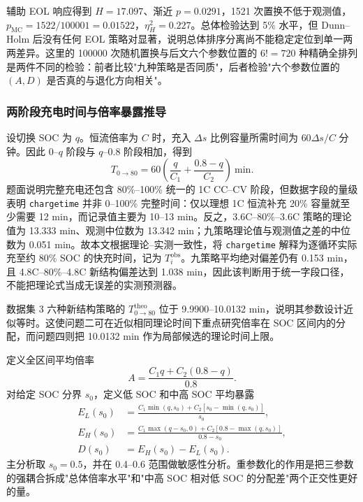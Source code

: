 \documentclass[withoutpreface]{cumcmthesis}
\begin{document}
辅助 EOL 响应得到 $H=17.097$、渐近 $p=0.0291$，1521 次置换不低于观测值，$p_{\mathrm{MC}}=1522/100001=0.01522$，$\eta_H^2=0.227$。总体检验达到 5\% 水平，但 Dunn--Holm 后没有任何 EOL 策略对显著，说明总体排序分离尚不能稳定定位到单一两两差异。这里的 100000 次随机置换与后文六个参数位置的 $6!=720$ 种精确全排列是两件不同的检验：前者比较"九种策略是否同质"，后者检验"六个参数位置的 $(A,D)$ 是否真的与退化方向相关"。

\subsubsection{两阶段充电时间与倍率暴露推导}

设切换 SOC 为 $q$。恒流倍率为 $C$ 时，充入 $\Delta s$ 比例容量所需时间为 $60\Delta s/C$ 分钟。因此 0--$q$ 阶段与 $q$--0.8 阶段相加，得到
\begin{equation}
T_{0\rightarrow80}=60\left(\frac{q}{C_1}+\frac{0.8-q}{C_2}\right)\ \mathrm{min}.
\label{eq:time}
\end{equation}
题面说明完整充电还包含 80\%--100\% 统一的 1C CC--CV 阶段，但数据字段的量级表明 \texttt{chargetime} 并非 0--100\% 完整时间：仅以理想 1C 恒流补充 20\% 容量就至少需要 12 min，而记录值主要为 10--13 min。反之，3.6C--80\%--3.6C 策略的理论值为 13.333 min、观测中位数为 13.342 min；九策略理论值与观测值之差的中位数为 0.051 min。故本文根据理论--实测一致性，将 \texttt{chargetime} 解释为逐循环实际充至约 80\% SOC 的快充时间，记为 $T_i^{\mathrm{obs}}$。九策略平均绝对偏差仍有 0.153 min，且 4.8C--80\%--4.8C 新结构偏差达到 1.038 min，因此该判断用于统一字段口径，不能把理论式当成无误差的实测预测器。

数据集 3 六种新结构策略的 $T_{0\rightarrow80}^{\mathrm{theo}}$ 位于 9.9900--10.0132 min，说明其参数设计近似等时。这使问题二可在近似相同理论时间下重点研究倍率在 SOC 区间内的分配，而问题四则把 10.0132 min 作为局部候选的理论时间上限。

定义全区间平均倍率
\begin{equation}
A=\frac{C_1q+C_2(0.8-q)}{0.8}.
\end{equation}
对给定 SOC 分界 $s_0$，定义低 SOC 和中高 SOC 平均暴露
\begin{align}
E_L(s_0)&=\frac{C_1\min(q,s_0)+C_2[s_0-\min(q,s_0)]}{s_0},\\
E_H(s_0)&=\frac{C_1\max(q-s_0,0)+C_2[0.8-\max(q,s_0)]}{0.8-s_0},\\
D(s_0)&=E_H(s_0)-E_L(s_0).
\end{align}
主分析取 $s_0=0.5$，并在 0.4--0.6 范围做敏感性分析。重参数化的作用是把三参数的强耦合拆成"总体倍率水平"和"中高 SOC 相对低 SOC 的分配差"两个正交性更好的量。
\end{document}
